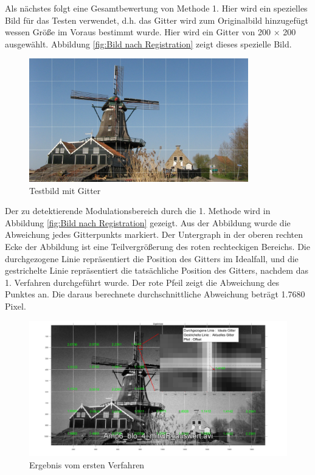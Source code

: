 Als nächstes folgt eine Gesamtbewertung von Methode 1. Hier wird ein spezielles Bild für das Testen verwendet, d.h. das Gitter wird zum Originalbild hinzugefügt wessen Größe im Voraus bestimmt wurde. Hier wird ein Gitter von 200 × 200 ausgewählt. Abbildung \ref{fig:Bild nach Registration} zeigt dieses spezielle Bild.
\begin{figure}[H]
 \centering 
  \includegraphics[keepaspectratio,width=0.85\textwidth]{images/6_Auswertung/windmill_auswert.pdf}
 \caption{Testbild mit Gitter}
 \label{fig:GitterBild}
\end{figure}

Der zu detektierende Modulationsbereich durch die 1. Methode wird in Abbildung \ref{fig:Bild nach Registration} gezeigt. Aus der Abbildung wurde die Abweichung jedes Gitterpunkts markiert. Der Untergraph in der oberen rechten Ecke der Abbildung ist eine Teilvergrößerung des roten rechteckigen Bereichs. Die durchgezogene Linie repräsentiert die Position des Gitters im Idealfall, und die gestrichelte Linie repräsentiert die tatsächliche Position des Gitters, nachdem das 1. Verfahren durchgeführt wurde. Der rote Pfeil zeigt die Abweichung des Punktes an. Die daraus berechnete durchschnittliche Abweichung beträgt 1.7680 Pixel. 

\begin{figure}[H]
 \centering 
  \includegraphics[keepaspectratio,width=1.00\textwidth]{images/6_Auswertung/Ergebnis1.pdf}
 \caption{Ergebnis vom ersten Verfahren}
 \label{fig:Ergebnis1}
\end{figure}

